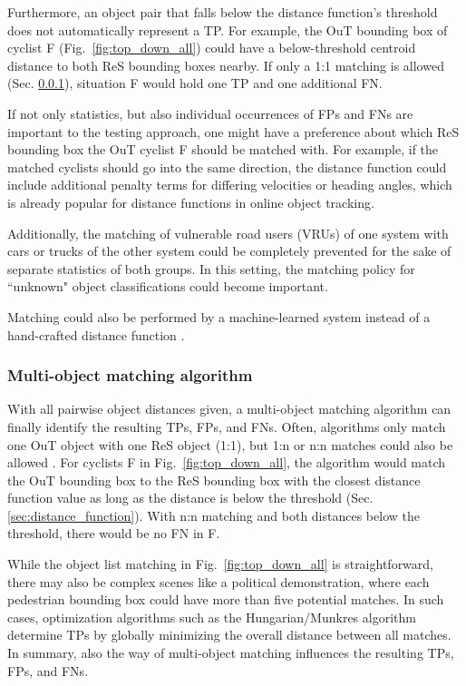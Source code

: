 \documentclass[conference]{IEEEtran}
\begin{document}

Furthermore, an object pair that falls below the distance function's threshold does not automatically represent a TP. 
For example, the OuT bounding box of cyclist F (Fig.~\ref{fig:top_down_all}) could have a below-threshold centroid distance to both ReS bounding boxes nearby. 
If only a 1:1 matching is allowed (Sec. \ref{sec:multi_object_matching}), situation F would hold one TP and one additional FN.

If not only statistics, but also individual occurrences of FPs and FNs are important to the testing approach, one might have a preference about which ReS bounding box the OuT cyclist F should be matched with. 
For example, if the matched cyclists should go into the same direction, the distance function could include additional penalty terms for differing velocities or heading angles, which is already popular for distance functions in online object tracking. 

Additionally, the matching of vulnerable road users (VRUs) of one system with cars or trucks of the other system could be completely prevented for the sake of separate statistics of both groups. 
In this setting, the matching policy for ``unknown" object classifications could become important.

Matching could also be performed by a machine-learned system instead of a hand-crafted distance function \cite{Sondell2018}.




\subsubsection{Multi-object matching algorithm}
\label{sec:multi_object_matching}

With all pairwise object distances given, a multi-object matching algorithm can finally identify the resulting TPs, FPs, and FNs. 
Often, algorithms only match one OuT object with one ReS object (1:1), but 1:n or n:n matches could also be allowed \cite[Sec. 11.3]{Brahmi2020diss}. 
For cyclists F in Fig.~\ref{fig:top_down_all}, the algorithm would match the OuT bounding box to the ReS bounding box with the closest distance function value as long as the distance is below the threshold (Sec. \ref{sec:distance_function}). 
With n:n matching and both distances below the threshold, there would be no FN in F.

While the object list matching in Fig.~\ref{fig:top_down_all} is straightforward, there may also be complex scenes like a political demonstration, where each pedestrian bounding box could have more than five potential matches. %
In such cases, optimization algorithms such as the Hungarian/Munkres algorithm determine TPs by globally minimizing the overall distance between all matches.
In summary, also the way of multi-object matching influences the resulting TPs, FPs, and FNs.
\end{document}

